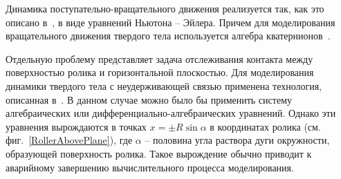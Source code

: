 

%

Динамика поступательно-вращательного движения реализуется так, как это описано
в~\cite{Kosenko2007}, в виде уравнений Ньютона -- Эйлера. Причем для 
моделирования вращательного движения твердого тела используется алгебра 
кватернионов~\cite{KosenkoQuaternionRus,Kosenko1998}.

Отдельную проблему представляет задача отслеживания контакта между поверхностью 
ролика и горизонтальной плоскостью. Для моделирования динамики твердого тела с
неудерживающей связью применена технология, описанная в~\cite{Kosenko2006}. В
данном случае можно было бы применить систему алгебраических или 
дифференциально-алгебраических уравнений. Однако эти уравнения вырождаются в 
точках $x=\pm R\sin\alpha $ в координатах ролика (см. фиг.~\ref{RollerAbovePlane}), где $\alpha$ -- половина угла раствора дуги окружности, образующей поверхность ролика. Такое вырождение обычно 
приводит к аварийному завершению вычислительного процесса моделирования.

